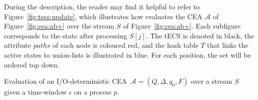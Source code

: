 During the description, the reader may find it helpful to refer to Figure~\ref{fig:tecs:update}, which illustrates how  evaluates the CEA $\mathcal{A}$ of Figure~\ref{fig:cea:ab+} over the stream $S$ of Figure~\ref{fig:cea:ab+}. Each subfigure corresponds to the state after processing $S[j]$. The tECS is denoted in black, the attribute $paths$ of each node is coloured red, and the hash table $T$ that links the active states to union-lists is illustrated in blue. For each position, the set  will be ordered top down.

\begin{algorithm}[t]
  \DontPrintSemicolon
  \SetAlgoNoEnd %
  \SetAlgoNoLine %
  \;
  \;
  \;
\caption{Evaluation of an I/O-deterministic \mbox{CEA ${\mathcal{A} = (Q, \Delta, q_{0}, F)}$} over a stream $S$ given a time-window $\epsilon$ on a process $p$.}
\label{algo:update}
\end{algorithm}

